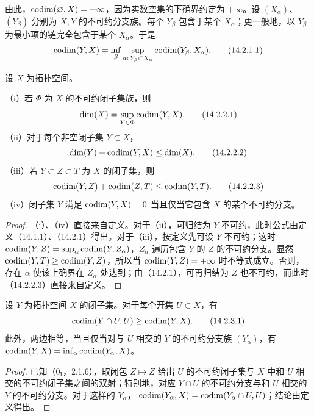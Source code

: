 由此，$\operatorname{codim}(\varnothing,X)=+\infty$，因为实数空集的下确界约定为 $+\infty$。设 $(X_\alpha)$、$(Y_\beta)$ 分别为 $X,Y$ 的不可约分支族。每个 $Y_\beta$ 包含于某个 $X_\alpha$；更一般地，以 $Y_\beta$ 为最小项的链完全包含于某个 $X_\alpha$。于是
\begin{equation}
 \operatorname{codim}(Y,X)=\inf_\beta\sup_{\alpha:\,Y_\beta\subset X_\alpha}
                      \operatorname{codim}(Y_\beta,X_\alpha).\tag{14.2.1.1}
\end{equation}

设 $X$ 为拓扑空间。

（i）若 $\Phi$ 为 $X$ 的不可约闭子集族，则
\begin{equation}\dim(X)=\sup_{Y\in\Phi}\operatorname{codim}(Y,X).\tag{14.2.2.1}\end{equation}
（ii）对于每个非空闭子集 $Y\subset X$，
\begin{equation}\dim(Y)+\operatorname{codim}(Y,X)\leq\dim(X).\tag{14.2.2.2}\end{equation}
（iii）若 $Y\subset Z\subset T$ 为 $X$ 的闭子集，则
\begin{equation}\operatorname{codim}(Y,Z)+\operatorname{codim}(Z,T)\leq\operatorname{codim}(Y,T).\tag{14.2.2.3}\end{equation}
（iv）闭子集 $Y$ 满足 $\operatorname{codim}(Y,X)=0$ 当且仅当它包含 $X$ 的某个不可约分支。
\begin{proof}
（i）、（iv）直接来自定义。对于（ii），可归结为 $Y$ 不可约，此时公式由定义（14.1.1）、（14.2.1）得出。对于（iii），按定义先可设 $Y$ 不可约；这时
$\operatorname{codim}(Y,Z)=\sup_\alpha\operatorname{codim}(Y,Z_\alpha)$，$Z_\alpha$ 遍历包含 $Y$ 的 $Z$ 的不可约分支。显然 $\operatorname{codim}(Y,T)\geq\operatorname{codim}(Y,Z)$，所以当 $\operatorname{codim}(Y,Z)=+\infty$ 时不等式成立。否则，存在 $\alpha$ 使该上确界在 $Z_\alpha$ 处达到；由（14.2.1），可再归结为 $Z$ 也不可约，而此时（14.2.2.3）直接来自定义。
\end{proof}

设 $Y$ 为拓扑空间 $X$ 的闭子集。对于每个开集 $U\subset X$，有
\begin{equation}
 \operatorname{codim}(Y\cap U,U)\geq\operatorname{codim}(Y,X).\tag{14.2.3.1}
\end{equation}
此外，两边相等，当且仅当对与 $U$ 相交的 $Y$ 的不可约分支族 $(Y_\alpha)$，有
$\operatorname{codim}(Y,X)=\inf_\alpha\operatorname{codim}(Y_\alpha,X)$。
\begin{proof}
已知（$0_{\mathrm I}$，2.1.6），取闭包 $Z\mapsto\overline Z$ 给出 $U$ 的不可约闭子集与 $X$ 中和 $U$ 相交的不可约闭子集之间的双射；特别地，对应 $Y\cap U$ 的不可约分支与和 $U$ 相交的 $Y$ 的不可约分支。对于这样的 $Y_\alpha$，
$\operatorname{codim}(Y_\alpha,X)=\operatorname{codim}(Y_\alpha\cap U,U)$；结论由定义得出。
\end{proof}

